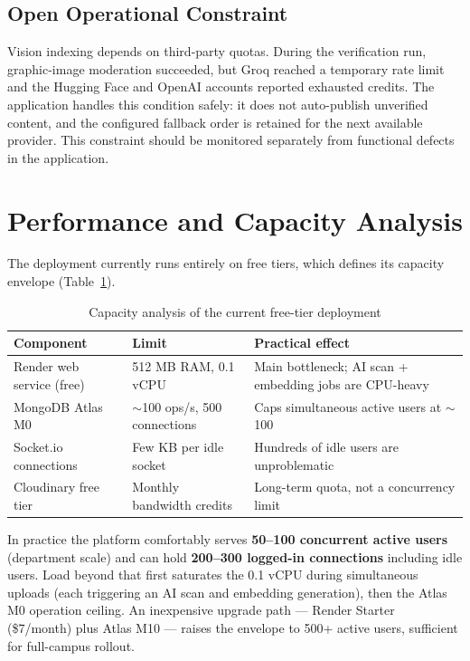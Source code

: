 \documentclass[12pt,a4paper]{report}
\begin{document}
\subsection{Open Operational Constraint}
Vision indexing depends on third-party quotas. During the verification
run, graphic-image moderation succeeded, but Groq reached a temporary
rate limit and the Hugging Face and OpenAI accounts reported exhausted
credits. The application handles this condition safely: it does not
auto-publish unverified content, and the configured fallback order is
retained for the next available provider. This constraint should be
monitored separately from functional defects in the application.

\section{Performance and Capacity Analysis}
The deployment currently runs entirely on free tiers, which defines
its capacity envelope (Table~\ref{tab:capacity}).

\begin{table}[htbp]
\centering
\caption{Capacity analysis of the current free-tier deployment}
\label{tab:capacity}
\begin{tabular}{@{}p{4.4cm}p{4.2cm}p{4.6cm}@{}}
\toprule
\textbf{Component} & \textbf{Limit} & \textbf{Practical effect} \\
\midrule
Render web service (free) & 512 MB RAM, 0.1 vCPU & Main bottleneck;
  AI scan + embedding jobs are CPU-heavy \\
MongoDB Atlas M0 & $\sim$100 ops/s, 500 connections & Caps
  simultaneous active users at $\sim$100 \\
Socket.io connections & Few KB per idle socket & Hundreds of idle
  users are unproblematic \\
Cloudinary free tier & Monthly bandwidth credits & Long-term quota,
  not a concurrency limit \\
\bottomrule
\end{tabular}
\end{table}

In practice the platform comfortably serves \textbf{50--100
concurrent active users} (department scale) and can hold
\textbf{200--300 logged-in connections} including idle users.
Load beyond that first saturates the 0.1 vCPU during simultaneous
uploads (each triggering an AI scan and embedding generation), then
the Atlas M0 operation ceiling. An inexpensive upgrade path ---
Render Starter (\$7/month) plus Atlas M10 --- raises the envelope to
500+ active users, sufficient for full-campus rollout.
\end{document}
